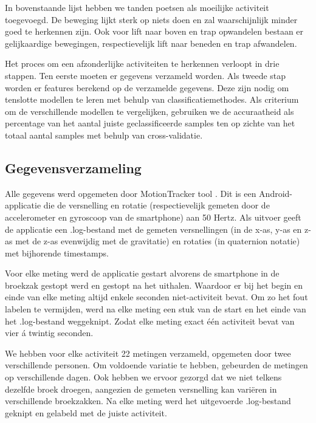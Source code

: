 \documentclass{article}
\begin{document}
In bovenstaande lijst hebben we tanden poetsen als moeilijke activiteit toegevoegd. De beweging lijkt sterk op niets doen en zal waarschijnlijk minder goed te herkennen zijn. Ook voor lift naar boven en trap opwandelen bestaan er gelijkaardige bewegingen, respectievelijk lift naar beneden en trap afwandelen.

Het proces om een afzonderlijke activiteiten te herkennen verloopt in drie stappen. Ten eerste moeten er gegevens verzameld worden. Als tweede stap worden er features berekend op de verzamelde gegevens. Deze zijn nodig om tenslotte modellen te leren met behulp van classificatiemethodes. Als criterium om de verschillende modellen te vergelijken, gebruiken we de accuraatheid als percentage van het aantal juiste geclassificeerde samples ten op zichte van het totaal aantal samples met behulp van cross-validatie.


\subsection{Gegevensverzameling}

Alle gegevens werd opgemeten door MotionTracker tool %
. Dit is een Android-applicatie die de versnelling en rotatie (respectievelijk gemeten door de accelerometer en gyroscoop van de smartphone) aan 50 Hertz.  Als uitvoer geeft de applicatie een .log-bestand met de gemeten versnellingen (in de x-as, y-as en z-as met de z-as evenwijdig met de gravitatie) en rotaties (in quaternion notatie) met bijhorende timestamps.

Voor elke meting werd de applicatie gestart alvorens de smartphone in de broekzak gestopt werd en gestopt na het uithalen. Waardoor er bij het begin en einde van elke meting altijd enkele seconden niet-activiteit bevat. Om zo het fout labelen te vermijden, werd na elke meting een stuk van de start en het einde van het .log-bestand weggeknipt. Zodat elke meting exact \'e\'en activiteit bevat van vier \'a twintig seconden. 

We hebben voor elke activiteit 22 metingen verzameld, opgemeten door twee verschillende personen. Om voldoende variatie te hebben, gebeurden de metingen op verschillende dagen. Ook hebben we ervoor gezorgd dat we niet telkens dezelfde broek droegen, aangezien de gemeten versnelling kan vari\"eren in verschillende broekzakken. Na elke meting werd het uitgevoerde .log-bestand geknipt en gelabeld met de juiste activiteit.
\end{document}
